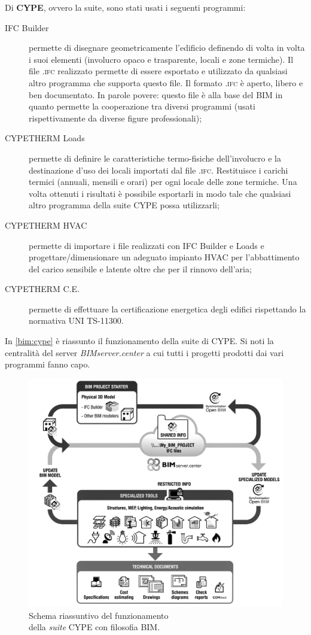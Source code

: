 Di \textbf{CYPE}, ovvero la suite, sono stati usati i seguenti programmi:
\begin{description}
	\item[IFC Builder]permette di disegnare geometricamente l'edificio definendo di volta in volta i suoi elementi (involucro opaco e trasparente, locali e zone termiche). Il file \textsc{.ifc} realizzato permette di essere esportato e utilizzato da qualsiasi altro programma che supporta questo file. Il formato \textsc{.ifc} è aperto, libero e ben documentato. In parole povere: questo file è alla base del BIM in quanto permette la cooperazione tra diversi programmi (usati rispettivamente da diverse figure professionali);
	\item[CYPETHERM Loads]permette di definire le caratteristiche termo-fisiche dell'involucro e la destinazione d'uso dei locali importati dal file \textsc{.ifc}. Restituisce i carichi termici (annuali, mensili e orari) per ogni locale delle zone termiche. Una volta ottenuti i risultati è possibile esportarli in modo tale che qualsiasi altro programma della suite CYPE possa utilizzarli;
	\item[CYPETHERM HVAC]permette di importare i file realizzati con IFC Builder e Loads e progettare/dimensionare un adeguato impianto HVAC per l'abbattimento del carico sensibile e latente oltre che per il rinnovo dell'aria;
	\item[CYPETHERM C.E.]permette di effettuare la certificazione energetica degli edifici rispettando la normativa UNI TS-11300.
\end{description}
In \vref{bim:cype} è riassunto il funzionamento della suite di CYPE. Si noti la centralità del server \emph{BIMserver.center} a cui tutti i progetti prodotti dai vari programmi fanno capo.
\begin{figure}[h]
	\centering
	\includegraphics[width=0.5\textheight]{6_2_cap/img/cypeflow}
	\caption[Schema BIM CYPE]{Schema riassuntivo del funzionamento\\ della \emph{suite} CYPE con filosofia BIM.}
	\label{bim:cype}
\end{figure}

